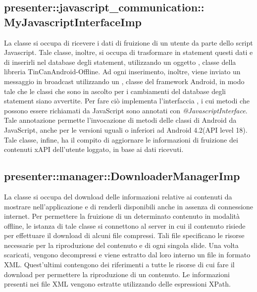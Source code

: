 \documentclass[../Tesi.tex]{subfiles}
\begin{document}
		\subsection{presenter::javascript\_communication::\\MyJavascriptInterfaceImp}
		La classe  si occupa di ricevere i dati di fruizione di un utente da parte dello script Javascript. Tale classe, inoltre, si occupa di trasformare in statement questi dati e di inserirli nel database degli statement, utilizzando un oggetto , classe della libreria TinCanAndroid-Offline. Ad ogni inserimento, inoltre, viene inviato un messaggio in broadcast utilizzando un , classe del framework Android, in modo tale che le classi che sono in ascolto per i cambiamenti del database degli statement siano avvertite. Per fare ciò implementa l'interfaccia , i cui metodi che possono essere richiamati da JavaScript sono annotati con \textit{@JavascriptInterface}. Tale annotazione permette l'invocazione di metodi delle classi di Android da JavaScript, anche per le versioni uguali o inferiori ad Android 4.2(API level 18). Tale classe, infine, ha il compito di aggiornare le informazioni di fruizione dei contenuti xAPI dell'utente loggato, in base ai dati ricevuti. 

		\subsection{presenter::manager::DownloaderManagerImp}
		La classe  si occupa del download delle informazioni relative ai contenuti da mostrare nell'applicazione e di renderli disponibili anche in assenza di connessione internet. Per permettere la fruizione di un determinato contenuto in modalità offline, le istanza di tale classe si connettono al server in cui il contenuto risiede per effettuare il download di alcuni file compressi. Tali file specificano le risorse necessarie per la riproduzione del contenuto e di ogni singola slide. Una volta scaricati, vengono decompressi e viene estratto dal loro interno un file in formato XML. Quest'ultimi contengono dei riferimenti a tutte le risorse di cui fare il download per permettere la riproduzione di un contenuto. Le informazioni presenti nei file XML vengono estratte utilizzando delle espressioni XPath. 
\end{document}
